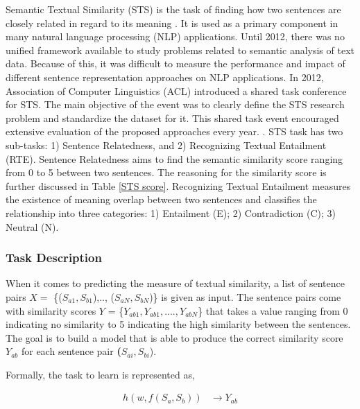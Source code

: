 \documentclass[12pt]{report} %
\begin{document}
Semantic Textual Similarity (STS) is the task of finding how two sentences are closely related in regard to its meaning \citep{agirre2012semeval}. It is used as a primary component in many natural language processing (NLP) applications. Until 2012, there was no unified framework available to study problems related to semantic analysis of text data. Because of this, it was difficult to measure the performance and impact of different sentence representation approaches on NLP applications. In 2012, Association of Computer Linguistics (ACL) introduced a shared task conference for STS. The main objective of the event was to clearly define the STS research problem and standardize the dataset for it. This shared task event encouraged extensive evaluation of the proposed approaches every year. \citep{agirre2012semeval}. STS task has two sub-tasks: 1) Sentence Relatedness, and 2) Recognizing Textual Entailment (RTE). Sentence Relatedness aims to find the semantic similarity score ranging from 0 to 5 between two sentences. The reasoning for the similarity score is further discussed in Table \ref{STS score}. Recognizing Textual Entailment measures the existence of meaning overlap between two sentences and classifies the relationship into three categories: 1) Entailment (E); 2) Contradiction (C); 3) Neutral (N).

\subsubsection*{Task Description}

When it comes to predicting the measure of textual similarity, a list of sentence pairs $X =$ \{($S_{a1},S_{b1}$),.., ($S_{aN},S_{bN}$)\} is given as input. The sentence pairs come with similarity scores $Y$ = \{$Y_{ab1}, Y_{ab1},...., Y_{abN}$\} that takes a value ranging from 0 indicating no similarity to 5 indicating the high similarity between the sentences. The goal is to build a model that is able to produce the correct similarity score $Y_{ab}$ for each sentence pair \textbf($S_{ai},S_{bi}$).


Formally, the task to learn is represented as,

\begin{align} 
h(w,f(S_a,S_b))  & \rightarrow Y_{ab} 
\end{align}
\end{document}
